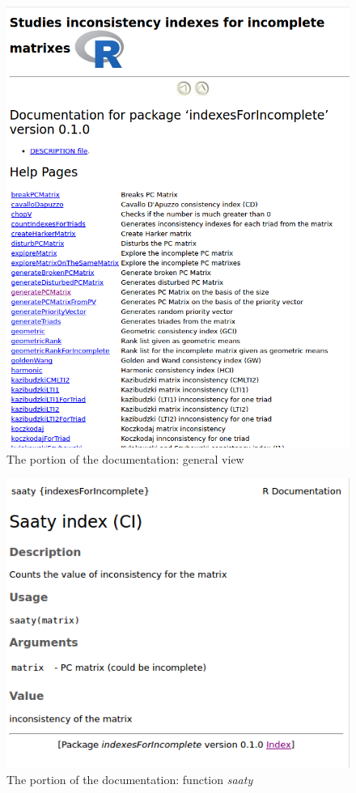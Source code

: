 \begin{figure}[h]
\centerline{\includegraphics[scale=0.58]{images/kod31.png}}
\caption{The portion of the documentation: general view}
\label{fig:rstudio}
\end{figure}

\begin{figure}[h]
\centerline{\includegraphics[scale=0.58]{images/kod32.png}}
\caption{The portion of the documentation: function \textit{saaty}}
\label{fig:rstudio}
\end{figure}

